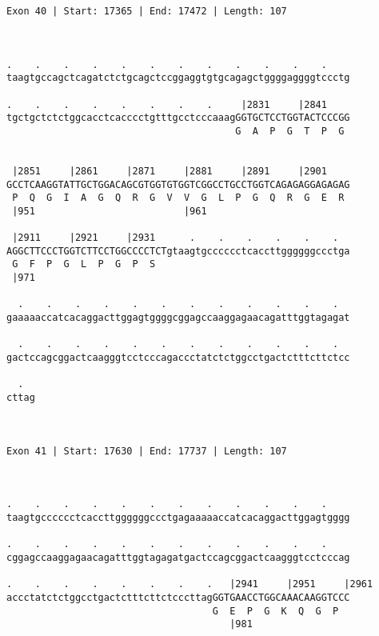 \documentclass{article}
\begin{document}
\begin{Verbatim}
Exon 40 | Start: 17365 | End: 17472 | Length: 107



.    .    .    .    .    .    .    .    .    .    .    .    
taagtgccagctcagatctctgcagctccggaggtgtgcagagctggggaggggtccctg
                                                            
.    .    .    .    .    .    .    .     |2831     |2841    
tgctgctctctggcacctcacccctgtttgcctcccaaagGGTGCTCCTGGTACTCCCGG
                                        G  A  P  G  T  P  G 
                                                            
  
 |2851     |2861     |2871     |2881     |2891     |2901    
GCCTCAAGGTATTGCTGGACAGCGTGGTGTGGTCGGCCTGCCTGGTCAGAGAGGAGAGAG
 P  Q  G  I  A  G  Q  R  G  V  V  G  L  P  G  Q  R  G  E  R 
 |951                          |961                         
  
 |2911     |2921     |2931      .    .    .    .    .    .  
AGGCTTCCCTGGTCTTCCTGGCCCCTCTgtaagtgcccccctcaccttggggggccctga
 G  F  P  G  L  P  G  P  S                                  
 |971                                                       
  
  .    .    .    .    .    .    .    .    .    .    .    .  
gaaaaaccatcacaggacttggagtggggcggagccaaggagaacagatttggtagagat
                                                            
  .    .    .    .    .    .    .    .    .    .    .    .  
gactccagcggactcaagggtcctcccagaccctatctctggcctgactctttcttctcc
                                                            
  .  
cttag
     
     
 
Exon 41 | Start: 17630 | End: 17737 | Length: 107



.    .    .    .    .    .    .    .    .    .    .    .    
taagtgcccccctcaccttggggggccctgagaaaaaccatcacaggacttggagtgggg
                                                            
.    .    .    .    .    .    .    .    .    .    .    .    
cggagccaaggagaacagatttggtagagatgactccagcggactcaagggtcctcccag
                                                            
.    .    .    .    .    .    .    .   |2941     |2951     |2961
accctatctctggcctgactctttcttctcccttagGGTGAACCTGGCAAACAAGGTCCC
                                    G  E  P  G  K  Q  G  P  
                                       |981                 
  

\end{Verbatim}
\end{document}
